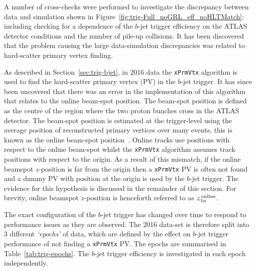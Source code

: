 \newpage

A number of cross-checks were performed to investigate the discrepancy between data and simulation shown in Figure~\ref{fig:trig-Full_noGRL_eff_noHLTMatch}:
including checking for a dependence of the $b$-jet trigger efficiency on the ATLAS detector conditions and the number of pile-up collisions.
It has been discovered that the problem causing the large data-simulation discrepancies was related to hard-scatter primary vertex finding.

As described in Section~\ref{sec:trig-bjet}, in 2016 data the \verb|xPrmVtx| algorithm is used to find the hard-scatter primary vertex (PV) in the $b$-jet trigger.
It has since been uncovered that there was an error in the implementation of this algorithm that relates to the online beam-spot position.
The beam-spot position is defined as the centre of the region where the two proton bunches cross in the ATLAS detector.
The beam-spot position is estimated at the trigger-level using the average position of reconstructed primary vertices over many events,
this is known as the online beam-spot position~\cite{trig-onlinePV}.
Online tracks use positions with respect to the online beam-spot
whilst the \verb|xPrmVtx| algorithm assumes track positions with respect to the origin.
As a result of this mismatch, if the online beamspot $z$-position is far from the origin then
a \verb|xPrmVtx| PV is often not found and a dummy PV with position at the origin is used by the $b$-jet trigger.
The evidence for this hypothesis is discussed in the remainder of this section.
For brevity, online beamspot $z$-position is henceforth referred to as $z_{\,\text{bs}}^{\text{\,online}}$.  

The exact configuration of the $b$-jet trigger has changed over time to respond to performance issues as they are observed.
The 2016 data-set is therefore split into 3 different \textit{`epochs'} of data, which are defined by the effect on $b$-jet trigger performance of not finding a \verb|xPrmVtx| PV.
The epochs are summarised in Table~\ref{tab:trig-epochs}.
The $b$-jet trigger efficiency is investigated in each epoch independently.


